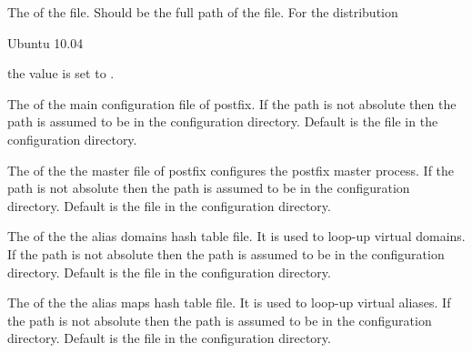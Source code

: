 
The  of the  file. Should be the full path 
of the file.
For the distribution
\begin{inparaitem}
\item[\TheDistribution{ubuntu}] Ubuntu 10.04
\end{inparaitem}
the value is set to .


The  of the main configuration file of postfix.
If the path is not absolute then the path is assumed to be
in the configuration directory.
Default is the file  in the configuration directory.


The  of the the master file of postfix configures
the postfix master process. 
If the path is not absolute then the path is assumed to be
in the configuration directory.
Default is the file  in the configuration directory.


The  of the the alias domains hash table file. It is used to loop-up
virtual domains. If the path is not absolute then the path is assumed to be
in the configuration directory. 
Default is the file  in the configuration directory.


The  of the the alias maps hash table file. It is used to loop-up
virtual aliases. If the path is not absolute then the path is assumed to be
in the configuration directory. 
Default is the file  in the configuration directory.


